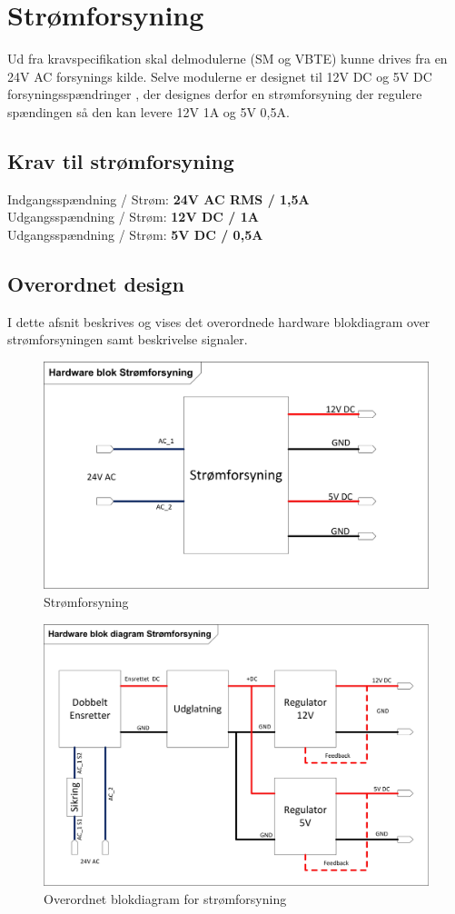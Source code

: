 \chapter{Strømforsyning}
Ud fra kravspecifikation skal delmodulerne (SM og VBTE) kunne drives fra en 24V AC forsynings kilde. Selve modulerne er designet til 12V DC og 5V DC forsyningsspændringer , der designes derfor en strømforsyning der regulere spændingen så den kan levere 12V 1A og 5V 0,5A.  
\section{Krav til strømforsyning}
Indgangsspændning / Strøm: \textbf{24V AC RMS / 1,5A} \\
Udgangsspændning / Strøm: \textbf{12V DC / 1A} \\
Udgangsspændning / Strøm: \textbf{5V DC / 0,5A} \\

\section{Overordnet design}
I dette afsnit beskrives og vises det overordnede hardware blokdiagram over strømforsyningen samt beskrivelse signaler.
\begin{figure}[H]
\centering
\includegraphics[scale=0.6]{billeder/PowerSupply}
\caption{Strømforsyning}
\label{fig:PowerSubbly}
\end{figure}
\begin{figure}[H]
\centering
\includegraphics[scale=0.8]{billeder/PowerSupplyBlok}
\caption{Overordnet blokdiagram for strømforsyning}
\label{fig:PowerSubbly Blok}
\end{figure}
